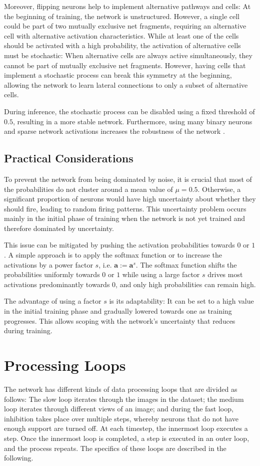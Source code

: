 Moreover, flipping neurons help to implement alternative pathways and cells: At the beginning of training, the network is unstructured.
However, a single cell could be part of two mutually exclusive net fragments, requiring an alternative cell with alternative activation characteristics.
While at least one of the cells should be activated with a high probability, the activation of alternative cells must be stochastic:
When alternative cells are always active simultaneously, they cannot be part of mutually exclusive net fragments.
However, having cells that implement a stochastic process can break this symmetry at the beginning, allowing the network to learn lateral connections to only a subset of alternative cells.

During inference, the stochastic process can be disabled using a fixed threshold of $0.5$, resulting in a more stable network.
Furthermore, using many binary neurons and sparse network activations increases the robustness of the network .


\subsection{Practical Considerations}
To prevent the network from being dominated by noise, it is crucial that most of the probabilities do not cluster around a mean value of $\mu = 0.5$. Otherwise, a significant proportion of neurons would have high uncertainty about whether they should fire, leading to random firing patterns. This uncertainty problem occurs mainly in the initial phase of training when the network is not yet trained and therefore dominated by uncertainty.

This issue can be mitigated by pushing the activation probabilities towards $0$ or $1$. A simple approach is to apply the softmax function or to increase the activations by a power factor $s$, i.e. $\boldsymbol{a} := \boldsymbol{a}^s$. The softmax function shifts the probabilities uniformly towards $0$ or $1$ while using a large factor $s$ drives most activations predominantly towards $0$, and only high probabilities can remain high.

The advantage of using a factor $s$ is its adaptability: It can be set to a high value in the initial training phase and gradually lowered towards one as training progresses. This allows scoping with the network's uncertainty that reduces during training.


\section{Processing Loops}
The network has different kinds of data processing loops that are divided as follows:
The slow loop iterates through the images in the dataset; the medium loop iterates through different views of an image; and during the fast loop, inhibition takes place over multiple steps, whereby neurons that do not have enough support are turned off.
At each timestep, the innermost loop executes a step. Once the innermost loop is completed, a step is executed in an outer loop, and the process repeats. The specifics of these loops are described in the following.

